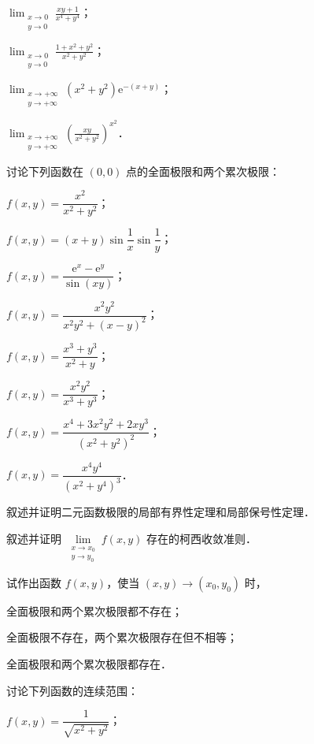 \begin{xiti}
\begin{ziti}
\item $\displaystyle\lim_{\substack{x\to0\\ y\to0}}\frac{xy+1}{x^{4}+y^{4}}$；
\item $\displaystyle\lim_{\substack{x\to0\\ y\to0}}\frac{1+x^{2}+y^{2}}{x^{2}+y^{2}}$；
\item $\displaystyle\lim_{\substack{x\to+\infty\\ y\to+\infty}}\left(x^{2}+y^{2}\right)\mathrm{e}^{-(x+y)}$；
\item $\displaystyle\lim_{\substack{x\to+\infty\\ y\to+\infty}}\left(\frac{xy}{x^{2}+y^{2}}\right)^{x^{2}}$．
\end{ziti}
\item 讨论下列函数在 $(0,0)$ 点的全面极限和两个累次极限：
\begin{ziti}
\item $f(x,y)=\dfrac{x^{2}}{x^{2}+y^{2}}$；
\item $f(x,y)=(x+y)\sin\dfrac{1}{x}\sin\dfrac{1}{y}$；
\item $f(x,y)=\dfrac{\mathrm{e}^{x}-\mathrm{e}^{y}}{\sin(xy)}$；
\item $f(x,y)=\dfrac{x^{2}y^{2}}{x^{2}y^{2}+(x-y)^{2}}$；
\item $f(x,y)=\dfrac{x^{3}+y^{3}}{x^{2}+y}$；
\item $f(x,y)=\dfrac{x^{2}y^{2}}{x^{3}+y^{3}}$；
\item $f(x,y)=\dfrac{x^{4}+3x^{2}y^{2}+2xy^{3}}{\left(x^{2}+y^{2}\right)^{2}}$；
\item $f(x,y)=\dfrac{x^{4}y^{4}}{\left(x^{2}+y^{4}\right)^{3}}$．
\end{ziti}
\item 叙述并证明二元函数极限的局部有界性定理和局部保号性定理．
\item 叙述并证明 $\lim\limits_{\substack{x\to x_{0}\\ y\to y_{0}}}f(x,y)$ 存在的柯西收敛准则．
\item 试作出函数 $f(x,y)$，使当 $(x,y)\to(x_{0},y_{0})$ 时，
\begin{ziti}
\item 全面极限和两个累次极限都不存在；
\item 全面极限不存在，两个累次极限存在但不相等；
\item 全面极限和两个累次极限都存在．
\end{ziti}
\item 讨论下列函数的连续范围：
\begin{ziti}
\item $f(x,y)=\dfrac{1}{\sqrt{x^{2}+y^{2}}}$；

\end{ziti}
\end{xiti}
